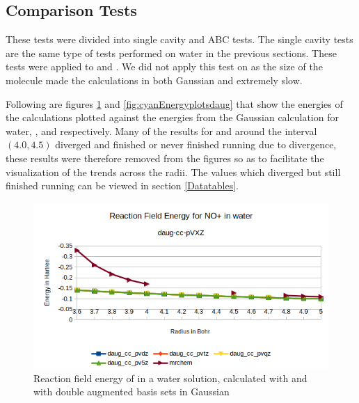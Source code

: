 \documentclass[../master_thesis.tex]{subfiles}
\begin{document}
\subsection{Comparison Tests}

These tests were divided into single cavity and \ac{ABC} tests. The single cavity
tests are the same type of tests performed on water in the previous sections. These
tests were applied to   and . We did not apply this test
on  as the size of the molecule made the calculations in both Gaussian
and \mrchem extremely slow.

Following are figures \ref{fig:nopEnergyplotsdaug} and \ref{fig:cyanEnergyplotsdaug}
that show the energies of the \mrchem calculations plotted
against the energies from the Gaussian calculation for water, , and
 respectively. Many of the \mrchem results for  and 
around the interval $(4.0, 4.5)$ diverged and finished or never finished
running due to divergence,  these results were therefore removed from the figures so as to facilitate
the visualization of the trends across the radii. The values which diverged but still
finished running can be viewed in section \ref{Datatables}.

\begin{figure}[h!]
  \centering
    \includegraphics[width=\linewidth]{img/Erdaugnop.png}
  \caption[Energy plots for ]{Reaction field energy of  in a water solution, calculated with \mrchem
  and with double augmented basis sets in Gaussian}
  \label{fig:nopEnergyplotsdaug}
\end{figure}
\end{document}
